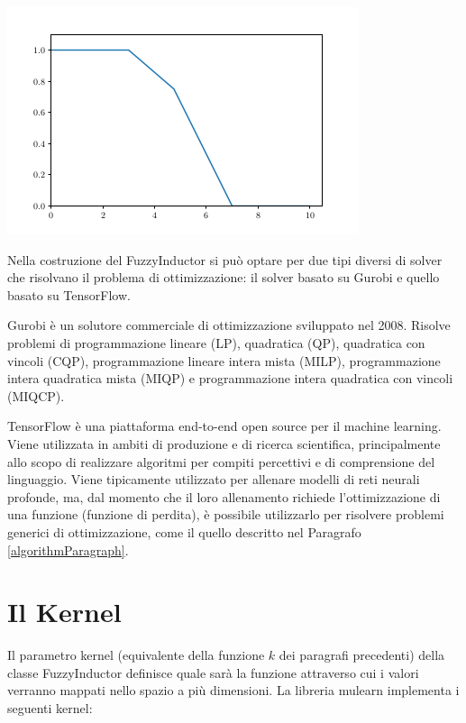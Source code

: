 \documentclass[12pt,a4paper]{report}
\begin{document}
\begin{itemize}
\begin{minipage}{\linewidth}
	\centering
       \includegraphics[width=0.8\linewidth]{images/quantileLinearPiecewiseFuzzifier.png}
	\label{quantileLinearConstantFuzzifierGraph}
\end{minipage}

\end{itemize}

Nella costruzione del FuzzyInductor si può optare per due tipi diversi di solver che risolvano il problema di ottimizzazione: il solver basato su Gurobi e quello basato su TensorFlow. 

Gurobi\cite{gurobi} è un solutore commerciale di ottimizzazione sviluppato nel 2008. Risolve problemi di programmazione lineare (LP), quadratica (QP), quadratica con vincoli (CQP), programmazione lineare intera mista (MILP), programmazione intera quadratica mista (MIQP) e programmazione intera quadratica con vincoli (MIQCP).

TensorFlow \cite{tensorFlow} è una piattaforma end-to-end open source per il machine learning. Viene utilizzata in ambiti di produzione e di ricerca scientifica, principalmente allo scopo di realizzare algoritmi per compiti percettivi e di comprensione del linguaggio. Viene tipicamente utilizzato per allenare modelli di reti neurali profonde, ma, dal momento che il loro allenamento richiede l'ottimizzazione di una funzione (funzione di perdita), è possibile utilizzarlo per risolvere problemi generici di ottimizzazione, come il quello descritto nel Paragrafo \ref{algorithmParagraph}.

\section{Il Kernel}\label{kernelSection}
Il parametro kernel (equivalente della funzione $k$ dei paragrafi precedenti) della classe FuzzyInductor definisce quale sarà la funzione attraverso cui i valori verranno mappati nello spazio a più dimensioni.
La libreria mulearn implementa i seguenti kernel:
\end{document}
